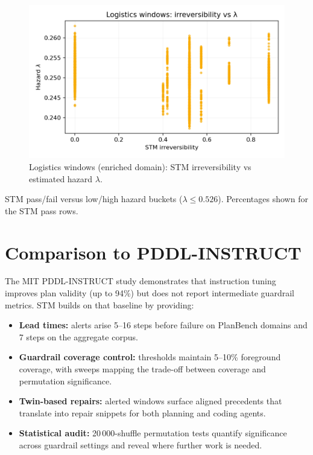 \documentclass[11pt]{article}
\begin{document}
\begin{figure}[h]
  \centering
  \includegraphics[width=0.72\linewidth]{../figures/fig3_logistics_irreversibility_vs_lambda.png}
  \caption{Logistics windows (enriched domain): STM irreversibility vs estimated hazard $\lambda$.}
  \label{fig:logistics-irrev-lambda}
\end{figure}

\begin{table}[h]
  \centering
  \caption{STM pass/fail versus low/high hazard buckets ($\lambda\leq0.526$).
  Percentages shown for the STM pass rows.}
  \label{tab:bridge-contingency}
  
\end{table}
\section{Comparison to PDDL-INSTRUCT}
The MIT PDDL-INSTRUCT study \cite{verma2025pddlinstruct} demonstrates that
instruction tuning improves plan validity (up to 94\%) but does not report
intermediate guardrail metrics. STM builds on that baseline by providing:
\begin{itemize}
  \item \textbf{Lead times:} alerts arise 5--16 steps before failure on PlanBench
  domains and 7 steps on the aggregate corpus.
  \item \textbf{Guardrail coverage control:} thresholds maintain 5--10\% foreground
  coverage, with sweeps mapping the trade-off between coverage and permutation
  significance.
  \item \textbf{Twin-based repairs:} alerted windows surface aligned precedents
  that translate into repair snippets for both planning and coding agents.
  \item \textbf{Statistical audit:} 20\,000-shuffle permutation tests quantify
  significance across guardrail settings and reveal where further work is needed.
\end{itemize}
\end{document}

